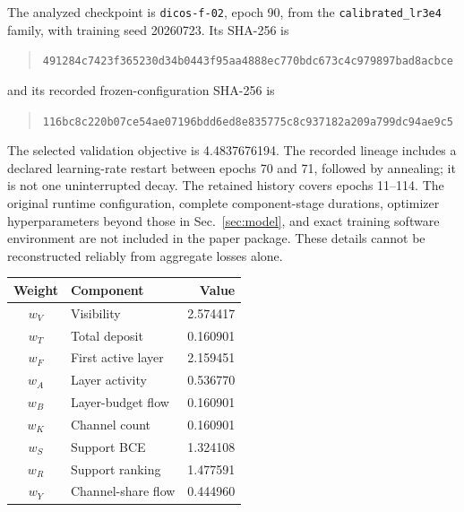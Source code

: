 \documentclass[11pt]{article}
\begin{document}
The analyzed checkpoint is \texttt{dicos-f-02}, epoch 90, from the \texttt{calibrated\_lr3e4} family, with training seed 20260723. Its SHA-256 is
\begin{quote}\footnotesize\nolinkurl{491284c7423f365230d34b0443f95aa4888ec770bdc673c4c979897bad8acbce}\end{quote}
and its recorded frozen-configuration SHA-256 is
\begin{quote}\footnotesize\nolinkurl{116bc8c220b07ce54ae07196bdd6ed8e835775c8c937182a209a799dc94ae9c5}\end{quote}
The selected validation objective is 4.4837676194. The recorded lineage includes a declared learning-rate restart between epochs 70 and 71, followed by annealing; it is not one uninterrupted decay. The retained history covers epochs 11--114. The original runtime configuration, complete component-stage durations, optimizer hyperparameters beyond those in Sec.~\ref{sec:model}, and exact training software environment are not included in the paper package. These details cannot be reconstructed reliably from aggregate losses alone.

\begin{center}
\begin{minipage}{0.82\linewidth}
\centering
{}
\label{tab:weights}
\small
\begin{tabular}{@{}clr@{}}
\toprule
Weight & Component & Value \\
\midrule
$w_{V}$ & Visibility & 2.574417 \\
$w_{T}$ & Total deposit & 0.160901 \\
$w_{F}$ & First active layer & 2.159451 \\
$w_{A}$ & Layer activity & 0.536770 \\
$w_{B}$ & Layer-budget flow & 0.160901 \\
$w_{K}$ & Channel count & 0.160901 \\
$w_{S}$ & Support BCE & 1.324108 \\
$w_{R}$ & Support ranking & 1.477591 \\
$w_{Y}$ & Channel-share flow & 0.444960 \\
\bottomrule
\end{tabular}
\end{minipage}
\end{center}
\end{document}
